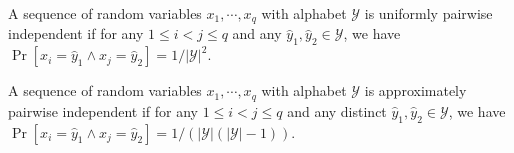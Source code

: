 

\begin{definition}
\label{def:upairwise}
A sequence of random variables $x_1,\cdots,x_q$ with alphabet $\mathcal Y$ is uniformly pairwise independent if for any $1\leq i<j\leq q$ and any $\hat y_1, \hat y_2 \in \mathcal Y$, we have
	$\Pr[x_i = \hat y_1 \land x_j = \hat y_2] = 1/|\mathcal{Y}|^2$.
\end{definition}


\begin{definition}
\label{def:apairwise}
A sequence of random variables $x_1,\cdots,x_q$ with alphabet $\mathcal Y$ is approximately pairwise independent if for any $1\leq i<j\leq q$ and any distinct $\hat y_1, \hat y_2 \in \mathcal Y$, we have
$\Pr[x_i = \hat y_1 \land x_j = \hat y_2] = 1/(|\mathcal{Y}|(|\mathcal{Y}|-1))$.
\end{definition}


